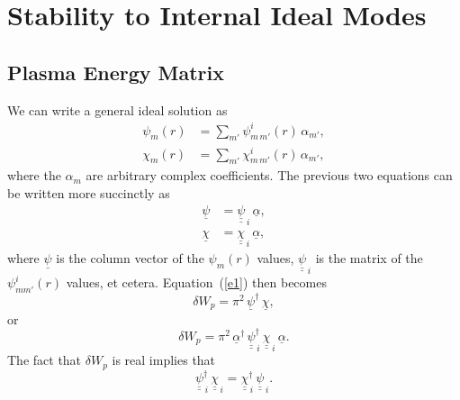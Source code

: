 \documentclass[12pt,prb,aps,notitlepage]{revtex4-1}
\begin{document}
\section{Stability to Internal Ideal Modes}
\subsection{Plasma Energy Matrix}
We can write a general ideal solution as
\begin{align}
\psi_m(r) &= \sum_{m'}\psi_{m\,m'}^i(r)\,\alpha_{m'},\\[0.5ex]
\chi_m(r) &= \sum_{m'}\chi_{m\,m'}^i(r)\,\alpha_{m'},
\end{align}
where the $\alpha_m$ are arbitrary complex coefficients. 
The previous two equations can be written more succinctly as
\begin{align}\label{e41}
\underline{\psi}&= \underline{\underline{\psi}}_{\,i}\,\underline{\alpha},\\[0.5ex]
\underline{\chi}&= \underline{\underline{\chi}}_{\,i}\,\underline{\alpha},\label{e42}
\end{align}
where $\underline{\psi}$ is the column vector of the $\psi_m(r)$ values, $\underline{\underline{\psi}}_{\,i}$ is the matrix of the $\psi_{mm'}^i(r)$ values,
et cetera. 
Equation~(\ref{e1}) then becomes
\begin{equation}
\delta W_p=\pi^2\,\underline{\psi}^\dag\,\underline{\chi},
\end{equation} 
or
\begin{equation}\label{e44}
\delta W_p =\pi^2\, \underline{\alpha}^\dag\,\underline{\underline{\psi}}^{\dag}_{\,i}\,\underline{\underline{\chi}}_{\,i}\,\underline{\alpha}.
\end{equation}
The fact that $\delta W_p$ is real implies that
 \begin{equation}\label{e47}
 \underline{\underline{\psi}}^{\dag}_{\,i}\,\underline{\underline{\chi}}_{\,i}= \underline{\underline{\chi}}^{\dag}_{\,i}\,\underline{\underline{\psi}}_{\,i}.
 \end{equation}
\end{document}

